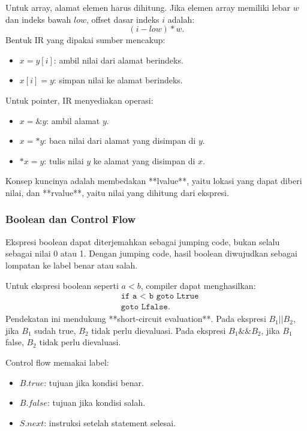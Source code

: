 Untuk array, alamat elemen harus dihitung. Jika elemen array memiliki lebar $w$ dan indeks bawah $low$, offset dasar indeks $i$ adalah:
\[
    (i-low) * w.
\]
Bentuk IR yang dipakai sumber mencakup:
\begin{itemize}
    \item $x = y[i]$: ambil nilai dari alamat berindeks.
    \item $x[i] = y$: simpan nilai ke alamat berindeks.
\end{itemize}

Untuk pointer, IR menyediakan operasi:
\begin{itemize}
    \item $x=\&y$: ambil alamat $y$.
    \item $x=*y$: baca nilai dari alamat yang disimpan di $y$.
    \item $*x=y$: tulis nilai $y$ ke alamat yang disimpan di $x$.
\end{itemize}

Konsep kuncinya adalah membedakan **lvalue**, yaitu lokasi yang dapat diberi nilai, dan **rvalue**, yaitu nilai yang dihitung dari ekspresi.

\subsubsection{Boolean dan Control Flow}

\begin{jawab}
Ekspresi boolean dapat diterjemahkan sebagai jumping code, bukan selalu sebagai nilai 0 atau 1. Dengan jumping code, hasil boolean diwujudkan sebagai lompatan ke label benar atau salah.
\end{jawab}

Untuk ekspresi boolean seperti $a<b$, compiler dapat menghasilkan:
\[
\begin{aligned}
    &\texttt{if a < b goto Ltrue}\\
    &\texttt{goto Lfalse}.
\end{aligned}
\]
Pendekatan ini mendukung **short-circuit evaluation**. Pada ekspresi $B_1 || B_2$, jika $B_1$ sudah true, $B_2$ tidak perlu dievaluasi. Pada ekspresi $B_1 \&\& B_2$, jika $B_1$ false, $B_2$ tidak perlu dievaluasi.

Control flow memakai label:
\begin{itemize}
    \item $B.true$: tujuan jika kondisi benar.
    \item $B.false$: tujuan jika kondisi salah.
    \item $S.next$: instruksi setelah statement selesai.
\end{itemize}

